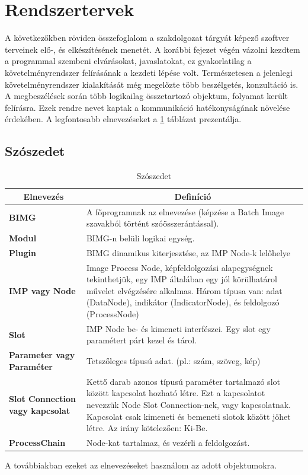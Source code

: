 \documentclass[a4paper,12pt,oneside]{report}
\begin{document}
\section{Rendszertervek}
A következőkben röviden összefoglalom a szakdolgozat tárgyát képező szoftver terveinek elő-, és elkészítésének menetét. A korábbi fejezet végén vázolni kezdtem a programmal szembeni elvárásokat, javaslatokat, ez gyakorlatilag a követelményrendszer felírásának a kezdeti lépése volt. Természetesen a jelenlegi követelményrendszer kialakítását még megelőzte több beszélgetés, konzultáció is.\\
A megbeszélések során több logikailag összetartozó objektum, folyamat került felírásra. Ezek rendre nevet kaptak a kommunikáció hatékonyságának növelése érdekében. A legfontosabb elnevezéseket a \ref{table:szoszedet} táblázat prezentálja.

\begin{table}[h]
\subsection{Szószedet}
\begin{tabular}{p{3cm}|p{10cm}}

\toprule
\multicolumn{1}{c}{\textbf{Elnevezés}} & \multicolumn{1}{c}{\textbf{Definíció}} \\ \midrule
\textbf{BIMG} & A főprogramnak az elnevezése (képzése a Batch Image szavakból történt szóösszerántással). \\
\hline
\textbf{Modul} & BIMG-n belüli logikai egység. \\
\hline
\textbf{Plugin} & BIMG dinamikus kiterjesztése, az IMP Node-k lelőhelye \\
\hline
\textbf{IMP vagy Node} & Image Process Node, képfeldolgozási alapegységnek tekinthetjük, egy IMP általában egy jól körülhatárol művelet elvégzésére alkalmas. Három típusa van: adat (DataNode), indikátor (IndicatorNode), és feldolgozó (ProcessNode) \\
\hline
\textbf{Slot} & IMP Node be- és kimeneti interfészei. Egy slot egy paramétert párt kezel és tárol. \\
\hline
\textbf{Parameter vagy Paraméter} & Tetszőleges típusú adat. (pl.: szám, szöveg, kép) \\
\hline
\textbf{Slot Connection vagy kapcsolat} & Kettő darab azonos típusú paraméter tartalmazó slot között kapcsolat hozható létre. Ezt a kapcsolatot nevezzük Node Slot Connection-nek, vagy kapcsolatnak. Kapcsolat csak kimeneti és bemeneti slotok között jöhet létre. Az irány kötelezően: Ki-Be. \\
\hline
\textbf{ProcessChain} & Node-kat tartalmaz, és vezérli a feldolgozást. \\

\hline
\end{tabular}
\caption{Szószedet}
\label{table:szoszedet}
\end{table}
 A továbbiakban ezeket az elnevezéseket használom az adott objektumokra.
\end{document}
